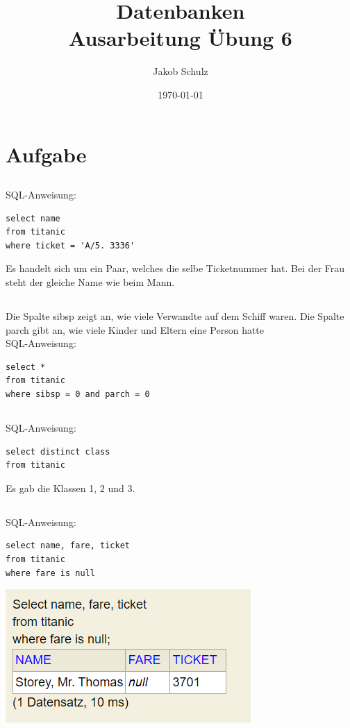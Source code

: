 \documentclass[a4paper, 11pt, titlepage]{article}
\begin{document}
\title{Datenbanken \\
Ausarbeitung \"Ubung 6}

\author{Jakob Schulz}

\date{\today}

\maketitle{\thispagestyle{plain}}

\section{Aufgabe}
\subsection{}
SQL-Anweisung:
\begin{lstlisting}[style = sql]
select name
from titanic
where ticket = 'A/5. 3336'
\end{lstlisting}
Es handelt sich um ein Paar, welches die selbe Ticketnummer hat. Bei der Frau steht der gleiche Name wie beim Mann.
\subsection{}
Die Spalte sibsp zeigt an, wie viele Verwandte auf dem Schiff waren. Die Spalte parch gibt an, wie viele Kinder und Eltern eine Person hatte\\
SQL-Anweisung:
\begin{lstlisting}[style = sql]
select *
from titanic
where sibsp = 0 and parch = 0
\end{lstlisting}
\subsection{}
SQL-Anweisung:
\begin{lstlisting}[style = sql]
select distinct class
from titanic
\end{lstlisting}
Es gab die Klassen 1, 2 und 3.
\subsection{}
SQL-Anweisung:
\begin{lstlisting}[style = sql]
select name, fare, ticket
from titanic
where fare is null
\end{lstlisting}
\includegraphics [width = 4 cm] {d}
\newpage
\end{document}
